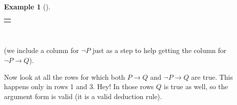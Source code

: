 \documentclass[10pt,]{book}
\theoremstyle{plain}
\theoremstyle{definition}
\theoremstyle{definition}
\newtheorem{example}[theorem]{Example}
\theoremstyle{definition}
\numberwithin{equation}{chapter}
\newlength{\panelmax}
\def\imp{\rightarrow}
\begin{document}
\begin{example}[]
{\setlength{\phAtabular}{\ht\panelboxAtabular+\dp\panelboxAtabular}
\settototalheight{\phAtabular}{\usebox{\panelboxAtabular}}
\setlength{\panelmax}{\maxof{\panelmax}{\phAtabular}}
\leavevmode%
\setlength{\tabcolsep}{0\linewidth}
\par\medskip\noindent
\begin{tabular}{@{}*{1}{c}@{}}
\begin{minipage}[c][\panelmax][t]{1\linewidth}\usebox{\panelboxAtabular}\end{minipage}\end{tabular}\\
}%
\par
\hypertarget{p-2329}{}%
(we include a column for \(\neg P\) just as a step to help getting the column for \(\neg P \imp Q\)).%
\par
\hypertarget{p-2330}{}%
Now look at all the rows for which both \(P \imp Q\) and \(\neg P \imp Q\) are true. This happens only in rows 1 and 3. Hey! In those rows \(Q\) is true as well, so the argument form is valid (it is a valid deduction rule).%
\end{example}
\end{document}
